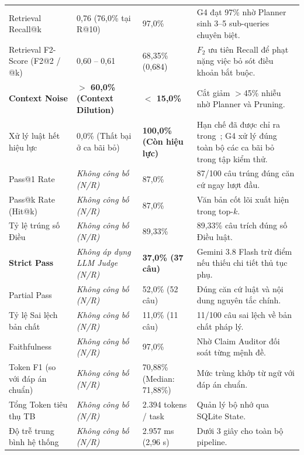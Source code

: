 \documentclass[10pt,a4paper]{article}
\begin{document}
\begin{table}[htbp]
\begin{tabularx}{\linewidth}{@{}p{4.2cm} p{3.8cm} p{3.4cm} X@{}}
Retrieval Recall@k & 0{,}76 (76{,}0\% tại R@10) \newline \cite[Bảng 3]{phan2026sbvlawgraph} & 97{,}0\% & G4 đạt 97\% nhờ Planner sinh 3--5 sub-queries chuyên biệt. \\
Retrieval F2-Score (F2@2 / @k) & 0{,}60 -- 0{,}61 \cite[Bảng 3]{phan2026sbvlawgraph} & 68{,}35\% (0{,}684) & $F_2$ ưu tiên Recall để phạt nặng việc bỏ sót điều khoản bắt buộc. \\
\textbf{Context Noise} & \textbf{$>$ 60{,}0\% (Context Dilution)} \newline \cite{phan2026sbvlawgraph} & \textbf{$<$ 15{,}0\%} & Cắt giảm $>$45\% nhiễu nhờ Planner và Pruning. \\
Xử lý luật hết hiệu lực & 0{,}0\% (Thất bại ở ca bãi bỏ) & \textbf{100{,}0\% (Còn hiệu lực)} & Hạn chế đã được chỉ ra trong~\cite{phan2026sbvlawgraph}; G4 xử lý đúng toàn bộ các ca bãi bỏ trong tập kiểm thử. \\
Pass@1 Rate & \emph{Không công bố (N/R)} & 87{,}0\% & 87/100 câu trúng đúng căn cứ ngay lượt đầu. \\
Pass@k Rate (Hit@k) & \emph{Không công bố (N/R)} & 87{,}0\% & Văn bản cốt lõi xuất hiện trong top-$k$. \\
Tỷ lệ trúng số Điều & \emph{Không công bố (N/R)} & 89{,}33\% & 89{,}33\% câu trích đúng số Điều luật. \\
\textbf{Strict Pass} & \emph{Không áp dụng LLM Judge (N/R)} & \textbf{37{,}0\% (37 câu)} & Gemini 3.8 Flash trừ điểm nếu thiếu chi tiết thủ tục phụ. \\
Partial Pass & \emph{Không công bố (N/R)} & 52{,}0\% (52 câu) & Đúng căn cứ luật và nội dung nguyên tắc chính. \\
Tỷ lệ Sai lệch bản chất & \emph{Không công bố (N/R)} & 11{,}0\% (11 câu) & 11/100 câu sai lệch về bản chất pháp lý. \\
Faithfulness & \emph{Không công bố (N/R)} & 97{,}0\% & Nhờ Claim Auditor đối soát từng mệnh đề. \\
Token F1 (so với đáp án chuẩn) & \emph{Không công bố (N/R)} & 70{,}88\% (Median: 71{,}88\%) & Mức trùng khớp từ ngữ với đáp án chuẩn. \\
Tổng Token tiêu thụ TB & \emph{Không công bố (N/R)} & 2.394 tokens / task & Quản lý bộ nhớ qua SQLite State. \\
Độ trễ trung bình hệ thống & \emph{Không công bố (N/R)} & 2.957 ms (2{,}96 s) & Dưới 3 giây cho toàn bộ pipeline. \\
\bottomrule
\end{tabularx}
\end{table}
\end{document}

